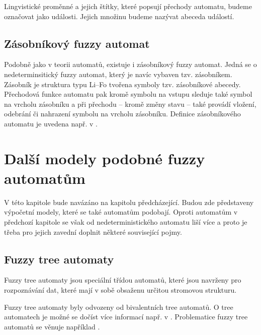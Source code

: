 \begin{notation}
 Lingvistické proměnné a jejich štítky, které popsují přechody automatu, budeme označovat jako události. Jejich množinu budeme nazývat abeceda událostí.
\end{notation}

\subsection{Zásobníkový fuzzy automat}
Podobně jako v  teorii automatů, existuje i zásobníkový fuzzy automat. Jedná se o nedeterminsitický fuzzy automat, který je navíc vybaven tzv. zásobníkem. Zásobník je struktura typu Li--Fo tvořena symboly tzv. zásobníkové abecedy. Přechodová funkce automatu pak kromě symbolu na vstupu sleduje také symbol na vrcholu zásobníku a při přechodu -- kromě změny stavu -- také provádí vložení, odebrání či nahrazení symbolu na vrcholu zásobníku. Definice zásobníkového automatu je uvedena např. v \cite{BucPas-FuzPusAut}.

\section{Další modely podobné fuzzy automatům}
V této kapitole bude navázáno na kapitolu předcházející. Budou zde představeny výpočetní modely, které se také automatům podobají. Oproti automatům v předchozí kapitole se však od  nedeterministického automatu liší více a proto je třeba pro jejich zavední doplnit některé související pojmy. 


\subsection{Fuzzy tree automaty}
Fuzzy tree automaty jsou speciální třídou automatů, které jsou navrženy pro rozpoznávání dat, které mají v sobě obsaženu určitou stromovou strukturu.

Fuzzy tree automaty byly odvozeny od  bivalentních tree automatů. O  tree automatech je možné se dočíst více informací např. v \cite{Com+-TreeAutTecApp, Hua-SyntPattRecSeisOilExp, Bez+-FuzModAlgPatRecImProc}. Problematice fuzzy tree automatů se věnuje například \cite{Lee-FuzTreAutSynPatRec, MogZadAme-NewDirInFuzzTreeAut,ChaJos-NoteFuzzTreeAut, EsiLiu-FuzzTreeAut, MorMal-FuzzyAutLang}.

